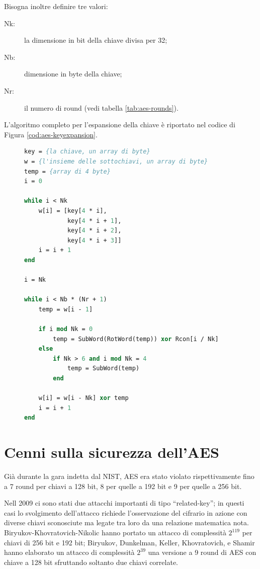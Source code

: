 \documentclass[12pt,a4paper,oneside]{book}
\begin{document}
Bisogna inoltre definire tre valori:
\begin{description}
\item[Nk:] la dimensione in bit della chiave divisa per 32;
\item[Nb:] dimensione in byte della chiave;
\item[Nr:] il numero di round (vedi tabella \ref{tab:aes-rounds}).
\end{description}

L'algoritmo completo per l'espansione della chiave è riportato nel codice di Figura \ref{cod:aes-keyexpansion}.

\vspace*{10pt}
\begin{figure}
\begin{lstlisting}[caption={\textit{Procedura di espansione della chiave AES.}},label={cod:aes-keyexpansion},language=Pascal]
key = {la chiave, un array di byte}
w = {l'insieme delle sottochiavi, un array di byte}
temp = {array di 4 byte}
i = 0

while i < Nk
	w[i] = [key[4 * i], 
	        key[4 * i + 1], 
	        key[4 * i + 2], 
	        key[4 * i + 3]]
	i = i + 1
end

i = Nk

while i < Nb * (Nr + 1)
	temp = w[i - 1]
	
	if i mod Nk = 0
		temp = SubWord(RotWord(temp)) xor Rcon[i / Nk]
	else 
		if Nk > 6 and i mod Nk = 4
			temp = SubWord(temp)
		end
	
	w[i] = w[i - Nk] xor temp
	i = i + 1
end
\end{lstlisting}
\end{figure}

\section{Cenni sulla sicurezza dell'AES}

Già durante la gara indetta dal \ac{NIST}, \ac{AES} era stato violato rispettivamente fino a 7 round per chiavi a 128 bit, 8 per quelle a 192 bit e 9 per quelle a 256 bit\cite{bib:schneier}.

Nell 2009 ci sono stati due attacchi importanti di tipo ``related-key''; in questi casi lo svolgimento dell'attacco richiede l'osservazione del cifrario in azione con diverse chiavi sconosciute ma legate tra loro da una relazione matematica nota. Biryukov-Khovratovich-Nikolic hanno portato un attacco di complessità $2^{119}$ per chiavi di 256 bit e 192 bit\cite{bib:aes-attack1}; Biryukov, Dunkelman, Keller, Khovratovich, e Shamir hanno elaborato un attacco di complessità $2^{39}$ una versione a 9 round di \ac{AES} con chiave a 128 bit sfruttando soltanto due chiavi correlate\cite{bib:aes-attack2}.
\end{document}
